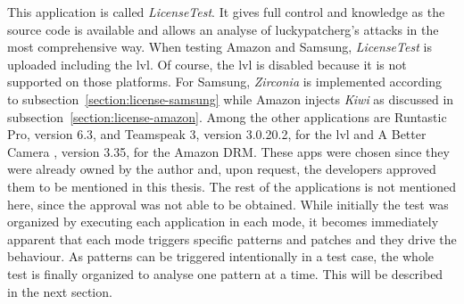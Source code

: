 This application is called \textit{LicenseTest}.
It gives full control and knowledge as the source code is available and allows an analyse of \gls{luckypatcherg}’s attacks in the most comprehensive way.
When testing Amazon and Samsung, \textit{LicenseTest} is uploaded including the \gls{lvl}.
Of course,  the \gls{lvl} is disabled because it is not supported on those platforms.
For Samsung, \textit{Zirconia} is implemented according to subsection~\ref{section:license-samsung} while Amazon injects \textit{Kiwi} as discussed in subsection~\ref{section:license-amazon}.
Among the other applications are Runtastic Pro\cite{runtasticApp}, version 6.3, and Teamspeak 3\cite{teamspeakApp}, version 3.0.20.2, for the \gls{lvl} and A Better Camera \cite{abettercamera}, version 3.35, for the Amazon DRM.
These apps were chosen since they were already owned by the author and, upon request, the developers approved them to be mentioned in this thesis.
The rest of the applications is not mentioned here, since the approval was not able to be obtained.
\newline
While initially the test was organized by executing each application in each mode, it becomes immediately apparent that each mode triggers specific patterns and patches and they drive the behaviour.
As patterns can be triggered intentionally in a test case, the whole test is finally organized to analyse one pattern at a time.
This will be described in the next section.
